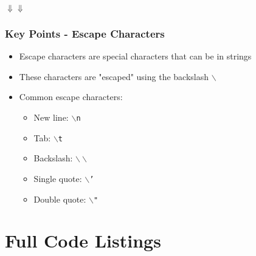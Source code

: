 \documentclass{book}
\newcommand{\pythonAndShellSub}[8]{
\usemintedstyle{autumn}
    \begin{listing}[htb]
 	   \begin{mdframed}[backgroundcolor=codebg]
            \inputminted[firstline=#2, lastline=#3, linenos]{python}{#1}
        \end{mdframed}
        \hspace{5em}$\Downarrow$\hfill$\Downarrow$\hspace{5em}
        \begin{mdframed}[backgroundcolor=codebg]
              
        \end{mdframed}
        \caption{#7}
        \label{#8}
    \end{listing}
}
\begin{document}
\pythonAndShellSub{../../../docCode/chapter2/section2/printIntroEscapes.py}
{17}{23}
{../../../docCode/chapter2/section2/printIntroEscapes.txt}
{18}{22}
{}
{pyshell:escapeChars-common}

\subsubsection*{Key Points - Escape Characters}
\begin{itemize}
    \item Escape characters are special characters that can be in strings
    \item These characters are "escaped" using the backslash \texttt{$\backslash$}
    \item Common escape characters:
    \begin{itemize}
        \item New line: \texttt{$\backslash$n}
        \item Tab: \texttt{$\backslash$t}
        \item Backslash: \texttt{$\backslash\backslash$}
        \item Single quote: \texttt{$\backslash$'}
        \item Double quote: \texttt{$\backslash$"}
    \end{itemize}
\end{itemize}


%


\section{Full Code Listings}

\printindex
\end{document}
